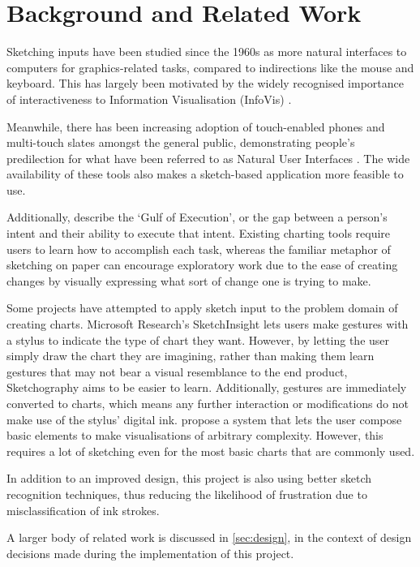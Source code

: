\section{Background and Related Work}
Sketching inputs have been studied since the 1960s \citep{sutherland_sketch_1964} as more natural interfaces to computers for graphics-related tasks, compared to indirections like the mouse and keyboard. This has largely been motivated by the widely recognised importance of interactiveness to Information Visualisation (InfoVis) \citep{lee_beyond_2012}. 

Meanwhile, there has been increasing adoption of touch-enabled phones and multi-touch slates amongst the general public, demonstrating people's predilection for what have been referred to as Natural User Interfaces \citep{lee_beyond_2012}. The wide availability of these tools also makes a sketch-based application more feasible to use.


Additionally, \cite{norman_user_1986} describe the `Gulf of Execution', or the gap between a person's intent and their ability to execute that intent. Existing charting tools require users to learn how to accomplish each task, whereas the familiar metaphor of sketching on paper can encourage exploratory work due to the ease of creating changes by visually expressing what sort of change one is trying to make.

Some projects have attempted to apply sketch input to the problem domain of creating charts. Microsoft Research's SketchInsight \citep{walny_understanding_2012} lets users make gestures with a stylus to indicate the type of chart they want. However, by letting the user simply draw the chart they are imagining, rather than making them learn gestures that may not bear a visual resemblance to the end product, Sketchography aims to be easier to learn. Additionally, gestures are immediately converted to charts, which means any further interaction or modifications do not make use of the stylus' digital ink. \cite{chao_poster:_2010} propose a system that lets the user compose basic elements to make visualisations of arbitrary complexity. However, this requires a lot of sketching even for the most basic charts that are commonly used.

In addition to an improved design, this project is also using better sketch recognition techniques, thus reducing the likelihood of frustration due to misclassification of ink strokes.

A larger body of related work is discussed in \autoref{sec:design}, in the context of design decisions made during the implementation of this project.

